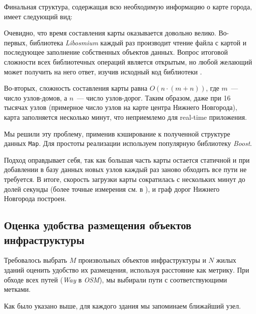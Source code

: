 \documentclass[11pt]{article}
\begin{document}
	Финальная структура, содержащая всю необходимую информацию о карте города, имеет следующий вид:
	
	
	
	Очевидно, что время составления карты оказывается довольно велико.
	Во-первых, библиотека \textit{Libosmium} каждый раз производит чтение файла с картой и последующее заполнение собственных объектов данных.
	Вопрос итоговой сложности всех библиотечных операций является открытым, но любой желающий может получить на него ответ, изучив исходный код библиотеки \cite{libosm-code}.
	
	Во-вторых, сложность составления карты равна $ O(n \cdot (m + n)) $, где $ m $~--- число узлов-домов, а $ n $~--- число узлов-дорог.
	Таким образом, даже при 16 тысячах узлов (примерное число узлов на карте центра Нижнего Новгорода), карта заполняется несколько минут, что неприемлемо для real-time приложения.
	
	Мы решили эту проблему, применив кэширование к полученной структуре данных \texttt{Map}.
	Для простоты реализации используем популярную библиотеку \textit{Boost}.
	
	
	
	
	Подход оправдывает себя, так как большая часть карты остается статичной и при добавлении в базу данных новых узлов каждый раз заново обходить все пути не требуется.
	В итоге, скорость загрузки карты сократилась с нескольких минут до долей секунды (более точные измерения см. в ), и граф дорог Нижнего Новгорода построен.
	
    \subsection{Оценка удобства размещения объектов инфраструктуры}
    
    Требовалось выбрать $ M $ произвольных объектов инфраструктуры и $ N $ жилых зданий оценить удобство их размещения, используя расстояние как метрику.
    При обходе всех путей (\textit{Way} в \textit{OSM}), мы выбирали пути с соответствующими метками.
    
    
    
    Как было указано выше, для каждого здания мы запоминаем ближайший узел.
    
    
    
\end{document}
